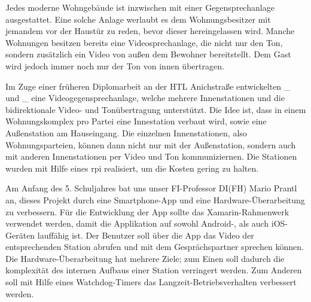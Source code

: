 Jedes moderne Wohngebäude ist inzwischen mit einer Gegensprechanlage ausgestattet.
Eine solche Anlage werlaubt es dem Wohnungsbesitzer mit jemandem vor der Haustür zu reden, bevor dieser hereingelassen wird.
Manche Wohnungen besitzen bereits eine Videosprechanlage, die nicht nur den Ton, sondern zusätzlich ein Video von außen dem Bewohner bereitstellt.
Dem Gast wird jedoch immer noch nur der Ton von innen übertragen.\par

Im Zuge einer früheren Diplomarbeit an der HTL Anichstraße entwickelten \_ und \_ eine Videogegensprechanlage, welche mehrere Innenstationen und die bidirektionale Video- und Tonübertragung unterstützt.
Die Idee ist, dass in einem Wohnungskomplex pro Partei eine Innestation verbaut wird, sowie eine Außenstation am Hauseingang.
Die einzelnen Innenstationen, also Wohnungsparteien, können dann nicht nur mit der Außenstation, sondern auch mit anderen Innenstationen per Video und Ton kommuniziernen.
Die Stationen wurden mit Hilfe eines \ac{rpi} realisiert, um die Kosten gering zu halten.\par

Am Anfang des 5. Schuljahres bat uns unser FI-Professor DI(FH) Mario Prantl an, dieses Projekt durch eine Smartphone-App und eine Hardware-Überarbeitung zu verbessern.
Für die Entwicklung der App sollte das Xamarin-Rahmenwerk verwendet werden, damit die Applikation auf sowohl Android-, als auch iOS-Geräten lauffähig ist. Der Benutzer soll über die App das Video der entsprechenden Station abrufen und mit dem Gesprächspartner sprechen können.
Die Hardware-Überarbeitung hat mehrere Ziele; zum Einen soll dadurch die komplexität des internen Aufbaus einer Station verringert werden.
Zum Anderen soll mit Hilfe eines Watchdog-Timers das Langzeit-Betriebsverhalten verbessert werden.
